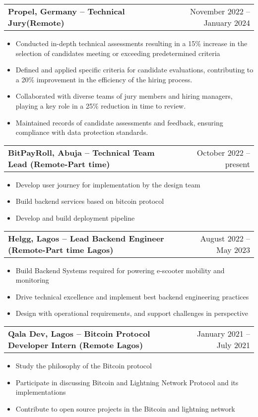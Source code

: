 \documentclass[a4paper,12pt]{article}
\makeatletter
\newenvironment{joblong}[2]
    {
    \begin{tabularx}{\linewidth}{@{}l X r@{}}
    \textbf{#1} & \hfill &  #2 \\[3.75pt]
    \end{tabularx}
    \begin{minipage}[t]{\linewidth}
    \begin{itemize}[nosep,after=\strut, leftmargin=1em, itemsep=3pt,label=--]
    }
    {
    \end{itemize}
    \end{minipage}    
    }
\makeatother
\begin{document}
\begin{joblong}{Propel, Germany -- Technical Jury(Remote)}{November 2022 -- January 2024}
\item Conducted in-depth technical assessments resulting in a 15\% increase in the selection of candidates meeting or exceeding predetermined criteria
\item Defined and applied specific criteria for candidate evaluations, contributing to a 20\% improvement in the efficiency of the hiring process. 
\item Collaborated with diverse teams of jury members and hiring managers, playing a key role in a 25\% reduction in time to review.
\item Maintained records of candidate assessments and feedback, ensuring compliance with data protection standards.
\end{joblong}

\begin{joblong}{BitPayRoll, Abuja -- Technical Team Lead (Remote-Part time)}{October 2022 -- present}
\item Develop user journey for implementation by the design team
\item Build backend services based on bitcoin protocol
\item Develop and build deployment pipeline
\end{joblong}

\begin{joblong}{Helgg, Lagos -- Lead Backend Engineer (Remote-Part time Lagos)}{August 2022 -- May 2023}
\item Build Backend Systems required for powering e-scooter mobility and monitoring
\item Drive technical excellence and implement best backend engineering practices
\item Design with operational requirements, and support challenges in perspective
\end{joblong}

\begin{joblong}{Qala Dev, Lagos -- Bitcoin Protocol Developer Intern (Remote Lagos)}{January 2021 -- July 2021}
\item Study the philosophy of the Bitcoin protocol
\item Participate in discussing Bitcoin and Lightning Network Protocol and its implementations
\item Contribute to open source projects in the Bitcoin and lightning network
\end{joblong}
\end{document}
